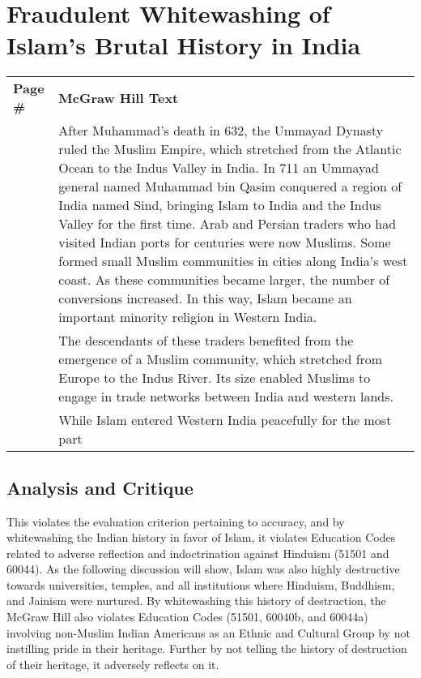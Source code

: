 \chapter[Fraudulent Whitewashing of\\ Islam’s Brutal History in India]{Fraudulent Whitewashing of Islam’s Brutal History in India}
  

\begin{longtable}{|>{\raggedleft}p{1.5cm}|p{8.5cm}|}
\multicolumn{2}{c}{\textbf{Table: 1}}\\ 
\hline
\textbf{Page \#} & \textbf{McGraw Hill Text} \tabularnewline
\hline
166 & After Muhammad’s death in 632, the Ummayad Dynasty ruled the Muslim Empire, which stretched from the Atlantic Ocean to the Indus Valley in India. In 711 an Ummayad general named Muhammad bin Qasim conquered a region of India named Sind, bringing Islam to India and the Indus Valley for the first time. Arab and Persian traders who had visited Indian ports for centuries were now Muslims. Some formed small Muslim communities in cities along India’s west coast. As these communities became larger, the number of conversions increased. In this way, Islam became an important minority religion in Western India. \tabularnewline
\hline
166 & The descendants of these traders benefited from the emergence of a Muslim community, which stretched from Europe to the Indus River. Its size enabled Muslims to engage in trade networks between India and western lands. \tabularnewline
\hline
166 & While Islam entered Western India peacefully for the most part \tabularnewline
\hline
\end{longtable}

\section*{Analysis and Critique} 

This violates the evaluation criterion pertaining to accuracy, and by whitewashing the Indian history in favor of Islam, it violates Education Codes related to adverse reflection and indoctrination against Hinduism (51501 and 60044). As the following discussion will show, Islam was also highly destructive towards universities, temples, and all institutions where Hinduism, Buddhism, and Jainism were nurtured. By whitewashing this history of destruction, the McGraw Hill also violates Education Codes (51501, 60040b, and 60044a) involving non-Muslim Indian Americans as an Ethnic and Cultural Group by not instilling pride in their heritage. Further by not telling the history of destruction of their heritage, it adversely reflects on it. 

